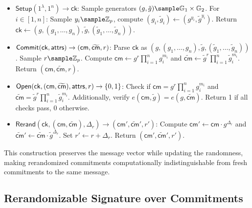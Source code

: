 \begin{itemize}
    \item $\mathsf{Setup}(1^\lambda, 1^n) \to \mathsf{ck}$:
    Sample generators $(g, \tilde{g}) \sample \G_1 \times \G_2$.
    For $i \in [1,n]$: Sample $y_i \sample \Z_p$, compute $(g_i, \tilde{g}_i) \gets (g^{y_i}, \tilde{g}^{y_i})$.
    Return $\mathsf{ck} \gets (g, (g_1,\ldots,g_n), \tilde{g}, (\tilde{g}_1,\ldots,\tilde{g}_n))$.
    
    \item $\mathsf{Commit}(\mathsf{ck}, \mathsf{attrs}) \to (\mathsf{cm}, \widetilde{\mathsf{cm}}, r)$:
    Parse $\mathsf{ck}$ as $(g, (g_1,\ldots,g_n), \tilde{g}, (\tilde{g}_1,\ldots,\tilde{g}_n))$.
    Sample $r \sample \Z_p$.
    Compute $\mathsf{cm} \gets g^r \prod_{i=1}^n g_i^{m_i}$ and $\widetilde{\mathsf{cm}} \gets \tilde{g}^r \prod_{i=1}^n \tilde{g}_i^{m_i}$.
    Return $(\mathsf{cm}, \widetilde{\mathsf{cm}}, r)$.
    
    \item $\mathsf{Open}(\mathsf{ck}, (\mathsf{cm}, \widetilde{\mathsf{cm}}), \mathsf{attrs}, r) \to \{0,1\}$:
    Check if $\mathsf{cm} = g^r \prod_{i=1}^n g_i^{m_i}$ and $\widetilde{\mathsf{cm}} = \tilde{g}^r \prod_{i=1}^n \tilde{g}_i^{m_i}$.
    Additionally, verify $e(\mathsf{cm}, \tilde{g}) = e(g, \widetilde{\mathsf{cm}})$.
    Return 1 if all checks pass, 0 otherwise.
    
    \item $\mathsf{Rerand}(\mathsf{ck}, (\mathsf{cm}, \widetilde{\mathsf{cm}}), \Delta_r) \to ({\mathsf{cm}}', \widetilde{\mathsf{cm}}', r')$:
    Compute ${\mathsf{cm}}' \gets \mathsf{cm} \cdot g^{\Delta_r}$ and $\widetilde{\mathsf{cm}}' \gets \widetilde{\mathsf{cm}} \cdot \tilde{g}^{\Delta_r}$.
    Set $r' \gets r + \Delta_r$.
    Return $({\mathsf{cm}}', \widetilde{\mathsf{cm}}', r')$.
\end{itemize}

This construction preserves the message vector while updating the randomness, making rerandomized commitments computationally indistinguishable from fresh commitments to the same message.









\subsection{Rerandomizable Signature over Commitments}\label{sec:rerandsig_commitment}



